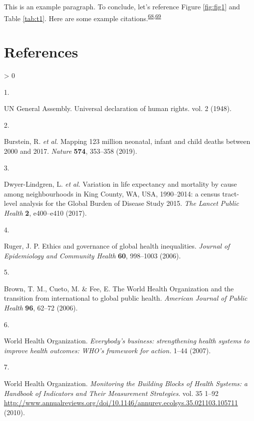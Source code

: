 \documentclass[
]{article}
\newlength{\cslhangindent}
\newlength{\csllabelwidth}
\newenvironment{CSLReferences}[2] %
 {%
  \setlength{\parindent}{0pt}
  \ifodd #1 \everypar{\setlength{\hangindent}{\cslhangindent}}\ignorespaces\fi
  \ifnum #2 > 0
  \setlength{\parskip}{#2\baselineskip}
  \fi
 }%
 {}
\newcommand{\CSLLeftMargin}[1]{\parbox[t]{\csllabelwidth}{#1}}
\newcommand{\CSLRightInline}[1]{\parbox[t]{\linewidth - \csllabelwidth}{#1}\break}
\begin{document}
This is an example paragraph. To conclude, let's reference Figure \ref{fig:fig1} and Table \ref{tab:t1}. Here are some example citations.\textsuperscript{\protect\hyperlink{ref-Aalbers}{68},\protect\hyperlink{ref-Aguirre2009}{69}}

\hypertarget{references}{%
\section{References}\label{references}}

\hypertarget{refs}{}
\begin{CSLReferences}{0}{0}
\leavevmode\hypertarget{ref-UNGeneralAssembly1948}{}%
\CSLLeftMargin{1. }
\CSLRightInline{UN General Assembly. {Universal declaration of human rights}. vol. 2 (1948).}

\leavevmode\hypertarget{ref-Burstein2019}{}%
\CSLLeftMargin{2. }
\CSLRightInline{Burstein, R. \emph{et al.} {Mapping 123 million neonatal, infant and child deaths between 2000 and 2017}. \emph{Nature} \textbf{574}, 353--358 (2019).}

\leavevmode\hypertarget{ref-Dwyer-Lindgren2017}{}%
\CSLLeftMargin{3. }
\CSLRightInline{Dwyer-Lindgren, L. \emph{et al.} {Variation in life expectancy and mortality by cause among neighbourhoods in King County, WA, USA, 1990--2014: a census tract-level analysis for the Global Burden of Disease Study 2015}. \emph{The Lancet Public Health} \textbf{2}, e400--e410 (2017).}

\leavevmode\hypertarget{ref-Ruger2006}{}%
\CSLLeftMargin{4. }
\CSLRightInline{Ruger, J. P. {Ethics and governance of global health inequalities}. \emph{Journal of Epidemiology and Community Health} \textbf{60}, 998--1003 (2006).}

\leavevmode\hypertarget{ref-Brown2006}{}%
\CSLLeftMargin{5. }
\CSLRightInline{Brown, T. M., Cueto, M. \& Fee, E. {The World Health Organization and the transition from international to global public health}. \emph{American Journal of Public Health} \textbf{96}, 62--72 (2006).}

\leavevmode\hypertarget{ref-WorldHealthOrganization2007}{}%
\CSLLeftMargin{6. }
\CSLRightInline{World Health Organization. \emph{{Everybody's business: strengthening health systems to improve health outcomes: WHO's framework for action.}} 1--44 (2007).}

\leavevmode\hypertarget{ref-WorldHealthOrganization2010}{}%
\CSLLeftMargin{7. }
\CSLRightInline{World Health Organization. \emph{{Monitoring the Building Blocks of Health Systems: a Handbook of Indicators and Their Measurement Strategies}}. vol. 35 1--92 \url{http://www.annualreviews.org/doi/10.1146/annurev.ecolsys.35.021103.105711} (2010).}


\end{CSLReferences}
\end{document}
